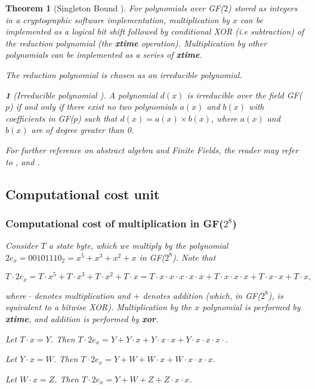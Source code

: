 \documentclass{report}
\newtheorem{theorem}{Theorem}{\bfseries}{\itshape}
\newtheorem*{concept}{}{\bfseries}{\itshape}
\begin{document}
\begin{theorem}[Singleton Bound \cite{SloaneBook}]
For polynomials over GF($2$) stored as integers in a cryptographic software implementation, multiplication by $x$ can be implemented as a logical bit shift followed by conditional XOR (i.e subtraction) of the reduction polynomial (the \textbf{xtime} operation). Multiplication by other polynomials can be implemented as a series of \textbf{xtime}.

The reduction polynomial is chosen as an irreducible polynomial.

\begin{concept}[Irreducible polynomial \cite{DesignOfRijndael2002}]
A polynomial $d(x)$ is irreducible over the field GF($p$) if and only if there exist no two polynomials $a(x)$ and $b(x)$ with coefficients in GF($p$) such that $d(x) = a(x) \times b(x)$, where $a(x)$ and $b(x)$ are of degree greater than 0.
\end{concept}

For further reference on abstract algebra and Finite Fields, the reader may refer to \cite{panario2007topicos}, \cite{panario2013handbook} and \cite{Handbook1996}.

\subsection{Computational cost unit}\label{sec:comp-cost}

\subsubsection{Computational cost of multiplication in GF($2^8$)}
Consider $T$ a state byte, which we multiply by the polynomial $2e_x = 00101110_2 = x^5 + x^3 + x^2 + x$ in GF($2^8$). Note that 

$$
T \cdot 2e_x = T \cdot x^5 + T \cdot x^3 + T \cdot x^2 + T \cdot x = T \cdot x \cdot x \cdot x \cdot x \cdot x + T \cdot x \cdot x \cdot x + T \cdot x \cdot x + T \cdot x,
$$

where $\cdot$ denotes multiplication and $+$ denotes addition (which, in GF($2^8$), is equivalent to a bitwise XOR). Multiplication by the $x$ polynomial is performed by \textbf{xtime}, and addition is performed by \textbf{xor}.

Let $T \cdot x = Y$. Then $T \cdot 2e_x = Y + Y \cdot x + Y \cdot x \cdot x + Y \cdot x \cdot x \cdot x \cdot $.

Let $Y \cdot x = W$. Then $T \cdot 2e_x = Y + W + W \cdot x + W \cdot x \cdot x \cdot x$.

Let $W \cdot x = Z$. Then $T \cdot 2e_x = Y + W + Z + Z \cdot x \cdot x$.


\end{theorem}
\end{document}
